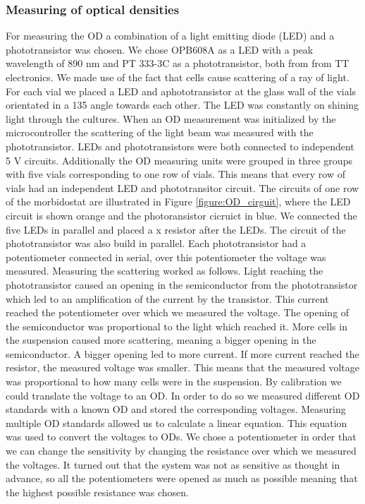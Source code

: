 \subsubsection{Measuring of optical densities}
For measuring the OD a combination of a light emitting diode (LED) and a phototransistor was chosen. We chose OPB608A as a LED with a peak wavelength of 890 nm and PT 333-3C as a phototransistor, both from from TT electronics. We made use of the fact that cells cause scattering of a ray of light. For each vial we placed a LED and aphototransistor at the glass wall of the vials orientated in a 135 \degree \space angle towards each other. The LED was constantly on shining light through the cultures. When an OD measurement was initialized by the microcontroller the scattering of the light beam was measured with the phototransistor. LEDs and phototransistors were both connected to independent 5 V circuits. Additionally the OD measuring units were grouped in three groups with five vials corresponding to one row of vials. This means that every row of vials had an independent LED and phototransitor circuit. The circuits of one row of the morbidostat are illustrated in Figure \ref{figure:OD_cirguit}, where the LED circuit is shown orange and the photoransistor cicruict in blue. We connected the five LEDs in parallel and placed a x \textOmega resistor after the LEDs. The circuit of the phototransistor was also build in parallel. Each phototransistor had a potentiometer connected in serial, over this potentiometer the voltage was measured. 
Measuring the scattering worked as follows. Light reaching the phototransistor caused an opening in the semiconductor from the phototransistor which led to an amplification of the current by the transistor. This current reached the potentiometer over which we measured the voltage. The opening of the semiconductor was proportional to the light which reached it. More cells in the suspension caused more scattering, meaning a bigger opening in the semiconductor. A bigger opening led to more current. If more current reached the resistor, the measured voltage was smaller. This means that the measured voltage was proportional to how many cells were in the suspension. By calibration we could translate the voltage to an OD. In order to do so we measured different OD standards with a known OD and stored the corresponding voltages. Measuring multiple OD standards allowed us to calculate a linear equation. This equation was used to convert the voltages to ODs. 
We chose a potentiometer in order that we can change the sensitivity by changing the resistance over which we measured the voltages. It turned out that the system was not as sensitive as thought in advance, so all the potentiometers were opened as much as possible meaning that the highest possible resistance was chosen.   

